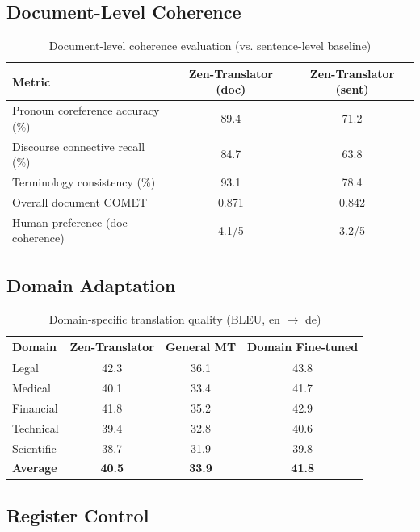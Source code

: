 \documentclass[11pt,a4paper]{article}
\begin{document}
\subsection{Document-Level Coherence}

\begin{table}[H]
\centering
\caption{Document-level coherence evaluation (vs. sentence-level baseline)}
\begin{tabular}{lcc}
\toprule
\textbf{Metric} & \textbf{Zen-Translator (doc)} & \textbf{Zen-Translator (sent)} \\
\midrule
Pronoun coreference accuracy (\%)  & 89.4 & 71.2 \\
Discourse connective recall (\%)   & 84.7 & 63.8 \\
Terminology consistency (\%)       & 93.1 & 78.4 \\
Overall document COMET             & 0.871 & 0.842 \\
Human preference (doc coherence)   & 4.1/5 & 3.2/5 \\
\bottomrule
\end{tabular}
\label{tab:doc}
\end{table}

\subsection{Domain Adaptation}

\begin{table}[H]
\centering
\caption{Domain-specific translation quality (BLEU, en $\to$ de)}
\begin{tabular}{lccc}
\toprule
\textbf{Domain} & \textbf{Zen-Translator} & \textbf{General MT} & \textbf{Domain Fine-tuned} \\
\midrule
Legal       & 42.3 & 36.1 & 43.8 \\
Medical     & 40.1 & 33.4 & 41.7 \\
Financial   & 41.8 & 35.2 & 42.9 \\
Technical   & 39.4 & 32.8 & 40.6 \\
Scientific  & 38.7 & 31.9 & 39.8 \\
\textbf{Average} & \textbf{40.5} & \textbf{33.9} & \textbf{41.8} \\
\bottomrule
\end{tabular}
\label{tab:domain}
\end{table}

\subsection{Register Control}
\end{document}
